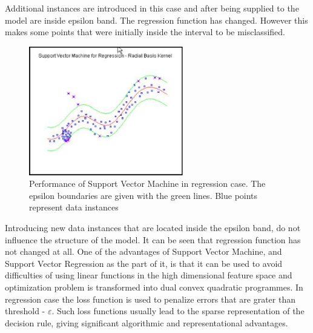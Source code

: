 Additional instances are introduced in this case and after being supplied to the model are 
inside epsilon band. The regression function has changed. 
However this makes some points that were initially inside the interval to be misclassified.
\begin{figure}[htb] 
	\label{fig:svm_demo3}
	\centering
	\includegraphics[width=0.6\textwidth]{figures/svm_demo3}
	\caption{Performance of Support Vector Machine in regression case.
	The epsilon boundaries are given with the green lines. Blue points represent data instances}
\end{figure}
Introducing new data instances that are located inside the epsilon band,
do not influence the structure of the model.
It can be seen that regression function has not changed at all.
One of the advantages of Support Vector Machine, and Support Vector Regression as the part of it,
is that it can be used to avoid difficulties of using linear functions in the high dimensional 
feature space and optimization problem is transformed into dual convex quadratic programmes.
In regression case the loss function is used to penalize errors that are grater than threshold 
- $\varepsilon$.
Such loss functions usually lead to the sparse representation of the decision rule,
giving significant algorithmic and representational advantages. 

